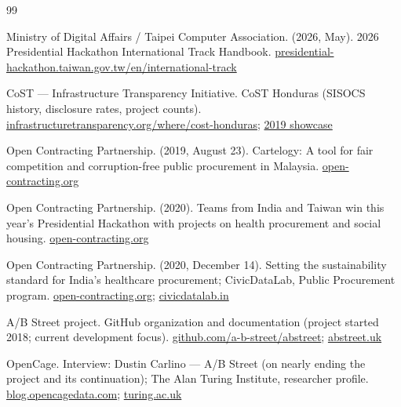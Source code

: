 \clearpage
{}
{}
\footnotesize
\begin{thebibliography}{99}\setlength{\itemsep}{2pt}

 Ministry of Digital Affairs / Taipei Computer Association.
(2026, May). 2026 Presidential Hackathon International Track Handbook.
\href{https://presidential-hackathon.taiwan.gov.tw/en/international-track/}{presidential-hackathon.taiwan.gov.tw/en/international-track}

 CoST --- Infrastructure Transparency Initiative. CoST Honduras
(SISOCS history, disclosure rates, project counts).
\href{https://infrastructuretransparency.org/where/cost-honduras/}{infrastructuretransparency.org/where/cost-honduras};
\href{https://infrastructuretransparency.org/news/cost-honduras-showcases-groundbreaking-tool-for-sustainable-infrastructure/}{2019 showcase}

 Open Contracting Partnership. (2019, August 23).
Cartelogy: A tool for fair competition and corruption-free public procurement
in Malaysia.
\href{https://www.open-contracting.org/2019/08/23/cartelogy-a-tool-for-fair-competition-and-corruption-free-public-procurement-in-malaysia/}{open-contracting.org}

 Open Contracting Partnership. (2020). Teams from India and
Taiwan win this year's Presidential Hackathon with projects on health
procurement and social housing.
\href{https://www.open-contracting.org/news/teams-from-india-and-taiwan-win-this-years-presidential-hackathon-with-projects-on-health-procurement-and-social-housing/}{open-contracting.org}

 Open Contracting Partnership. (2020, December 14). Setting
the sustainability standard for India's healthcare procurement; CivicDataLab,
Public Procurement program.
\href{https://www.open-contracting.org/2020/12/14/setting-the-sustainability-standard-for-indias-healthcare-procurement/}{open-contracting.org};
\href{https://civicdatalab.in/work/opencontracting/publicprocurement/}{civicdatalab.in}

 A/B Street project. GitHub organization and documentation
(project started 2018; current development focus).
\href{https://github.com/a-b-street/abstreet}{github.com/a-b-street/abstreet};
\href{https://abstreet.uk/services/}{abstreet.uk}

 OpenCage. Interview: Dustin Carlino --- A/B Street (on
nearly ending the project and its continuation); The Alan Turing Institute,
researcher profile.
\href{https://blog.opencagedata.com/post/openstreetmap-interview-ab-street}{blog.opencagedata.com};
\href{https://www.turing.ac.uk/people/researchers/dustin-carlino}{turing.ac.uk}


\end{thebibliography}
